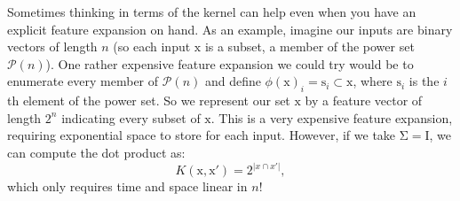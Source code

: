 \documentclass{article}
\newcommand{\mc}[1]{\mathcal{#1}}
\newcommand{\mat}[1]{\bm{\mathrm{#1}}}
\renewcommand{\vec}[1]{\bm{\mathrm{#1}}}
\begin{document}
Sometimes thinking in terms of the kernel can help even when you have
an explicit feature expansion on hand.  As an example, imagine our
inputs are binary vectors of length $n$ (so each input $\vec{x}$ is a
subset, a member of the power set $\mc{P}(n)$).  One rather expensive
feature expansion we could try would be to enumerate every member of
$\mc{P}(n)$ and define $\phi(\vec{x})_i = \vec{s}_i \subset \vec{x}$,
where $\vec{s}_i$ is the $i$th element of the power set.  So we
represent our set $\vec{x}$ by a feature vector of length $2^n$
indicating every subset of $\vec{x}$.  This is a very expensive
feature expansion, requiring exponential space to store for each
input.  However, if we take $\mat{\Sigma} = \mat{I}$, we can compute
the dot product as:
\begin{equation}
  K(\vec{x}, \vec{x}') = 2^{\lvert x \cap x' \rvert},
\end{equation}
which only requires time and space linear in $n$!
\end{document}
